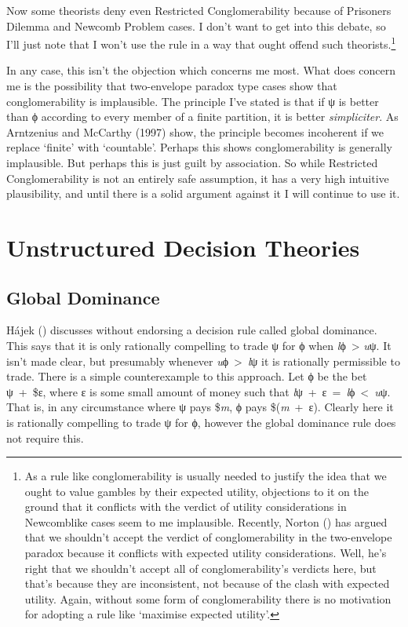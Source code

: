 \documentclass[
  10pt,
  letterpaper,
  DIV=11,
  numbers=noendperiod,
  twoside]{scrartcl}
\begin{document}
Now some theorists deny even Restricted Conglomerability because of
Prisoners Dilemma and Newcomb Problem cases. I don't want to get into
this debate, so I'll just note that I won't use the rule in a way that
ought offend such theorists.\footnote{As a rule like conglomerability is
  usually needed to justify the idea that we ought to value gambles by
  their expected utility, objections to it on the ground that it
  conflicts with the verdict of utility considerations in Newcomblike
  cases seem to me implausible. Recently, Norton
  () has argued that we shouldn't accept
  the verdict of conglomerability in the two-envelope paradox because it
  conflicts with expected utility considerations. Well, he's right that
  we shouldn't accept all of conglomerability's verdicts here, but
  that's because they are inconsistent, not because of the clash with
  expected utility. Again, without some form of conglomerability there
  is no motivation for adopting a rule like `maximise expected utility'.}

In any case, this isn't the objection which concerns me most. What does
concern me is the possibility that two-envelope paradox type cases show
that conglomerability is implausible. The principle I've stated is that
if ψ is better than ϕ according to every member of a finite partition,
it is better \emph{simpliciter}. As Arntzenius and McCarthy (1997) show,
the principle becomes incoherent if we replace `finite' with
`countable'. Perhaps this shows conglomerability is generally
implausible. But perhaps this is just guilt by association. So while
Restricted Conglomerability is not an entirely safe assumption, it has a
very high intuitive plausibility, and until there is a solid argument
against it I will continue to use it.

\section{Unstructured Decision
Theories}\label{unstructured-decision-theories}

\subsection{Global Dominance}\label{global-dominance}

Hájek () discusses without endorsing a
decision rule called global dominance. This says that it is only
rationally compelling to trade ψ for ϕ when \emph{l}ϕ~\textgreater{}
\emph{u}ψ. It isn't made clear, but presumably whenever
\emph{u}ϕ~\textgreater~\emph{l}ψ it is rationally permissible to trade.
There is a simple counterexample to this approach. Let ϕ be the bet
ψ~+~\$ε, where ε is some small amount of money such that
\emph{l}ψ~+~ε~=~\emph{l}ϕ~\textless~\emph{u}ψ. That is, in any
circumstance where ψ pays \$\emph{m}, ϕ pays \$(\emph{m}~+~ε). Clearly
here it is rationally compelling to trade ψ for ϕ, however the global
dominance rule does not require this.
\end{document}
